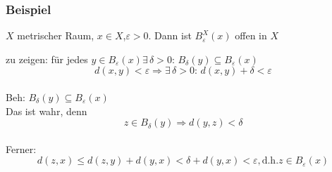\subsubsection{Beispiel} %
\label{ssub:beispiel}
$X$ metrischer Raum, $ x \in X$,$\varepsilon>0$. Dann ist $B_{\varepsilon}^X(x)$ offen in $X$

zu zeigen: für jedes $y \in B_{\varepsilon}(x) \exists\, \delta >0: \, B_{\delta }(y) \subseteq B_{\varepsilon}(x)$
\[
	d(x,y)<\varepsilon \Rightarrow  \exists\, \delta>0: \, d(x,y)+\delta <\varepsilon
\] \\
Beh: $B_{\delta }(y) \subseteq B_{\varepsilon}(x)$ \\
Das ist wahr, denn
\[
	z \in B_{\delta}(y) \Rightarrow d(y,z)<\delta 
\] \\
Ferner: 
\[
	d(z,x) \leq d(z,y)+d(y,x)<\delta + d(y,x)<\varepsilon, \text{d.h.} z \in B_{\varepsilon}(x)
\]
